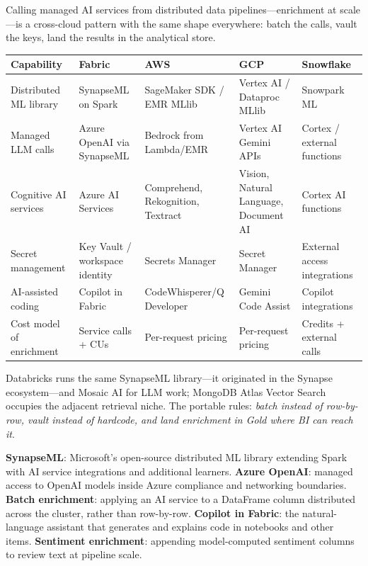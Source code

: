 \begin{crosscloud}
Calling managed AI services from distributed data pipelines---enrichment at scale---is a cross-cloud pattern with the same shape everywhere: batch the calls, vault the keys, land the results in the analytical store.

\vspace{2mm}
{\footnotesize
\begin{tabular}{@{}p{2.8cm}p{3.2cm}p{3.2cm}p{3.2cm}p{3.2cm}@{}}
\toprule
\textbf{Capability} & \textbf{Fabric} & \textbf{AWS} & \textbf{GCP} & \textbf{Snowflake} \\
\midrule
Distributed ML library & SynapseML on Spark & SageMaker SDK / EMR MLlib & Vertex AI / Dataproc MLlib & Snowpark ML \\
Managed LLM calls & Azure OpenAI via SynapseML & Bedrock from Lambda/EMR & Vertex AI Gemini APIs & Cortex / external functions \\
Cognitive AI services & Azure AI Services & Comprehend, Rekognition, Textract & Vision, Natural Language, Document AI & Cortex AI functions \\
Secret management & Key Vault / workspace identity & Secrets Manager & Secret Manager & External access integrations \\
AI-assisted coding & Copilot in Fabric & CodeWhisperer/Q Developer & Gemini Code Assist & Copilot integrations \\
Cost model of enrichment & Service calls + CUs & Per-request pricing & Per-request pricing & Credits + external calls \\
\bottomrule
\end{tabular}}

\vspace{1mm}
Databricks runs the same SynapseML library---it originated in the Synapse ecosystem---and Mosaic AI for LLM work; MongoDB Atlas Vector Search occupies the adjacent retrieval niche. The portable rules: \emph{batch instead of row-by-row, vault instead of hardcode, and land enrichment in Gold where BI can reach it}.
\end{crosscloud}

\begin{keyterms}
\textbf{SynapseML}: Microsoft's open-source distributed ML library extending Spark with AI service integrations and additional learners. \quad
\textbf{Azure OpenAI}: managed access to OpenAI models inside Azure compliance and networking boundaries. \quad
\textbf{Batch enrichment}: applying an AI service to a DataFrame column distributed across the cluster, rather than row-by-row. \quad
\textbf{Copilot in Fabric}: the natural-language assistant that generates and explains code in notebooks and other items. \quad
\textbf{Sentiment enrichment}: appending model-computed sentiment columns to review text at pipeline scale.
\end{keyterms}


